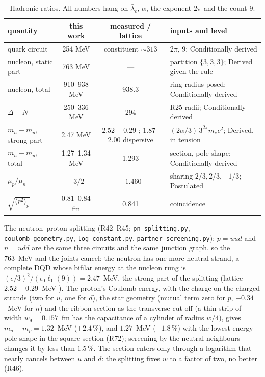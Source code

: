 \documentclass[11pt,a4paper]{article}
\theoremstyle{plain}
\theoremstyle{remark}
\newcommand{\lb}{\ensuremath{\bar\lambda_e}}
\newcommand{\lone}{\ensuremath{\ell_1}}
\begin{document}
\begin{table}[h]
\centering\small
\begin{tabular}{lccl}
\toprule
quantity & this work & measured / lattice & inputs and level \\
\midrule
quark circuit & 254 MeV & constituent $\sim 313$ & $2\pi$, 9; Conditionally derived \\
nucleon, static part & 763 MeV & --- & partition $\{3,3,3\}$; Derived given the rule \\
nucleon, total & 910--938 MeV & 938.3 & ring radius posed; Conditionally derived \\
$\Delta - N$ & 250--336 MeV & 294 & R25 radii; Conditionally derived \\
$m_n - m_p$, strong part & 2.47 MeV & $2.52 \pm 0.29$ \cite{bmw}; $1.87$--$2.00$ dispersive \cite{glr,sumrule2026} & $(2\alpha/3)\,3^{2\pi} m_e c^2$; Derived, in tension \\
$m_n - m_p$, total & 1.27--1.34 MeV & 1.293 & section, pole shape; Conditionally derived \\
$\mu_p/\mu_n$ & $-3/2$ & $-1.460$ & sharing $2/3, 2/3, -1/3$; Postulated \\
$\sqrt{\langle r^2\rangle_p}$ & 0.81--0.84 fm & 0.841 & coincidence \\
\bottomrule
\end{tabular}
\caption{Hadronic ratios. All numbers hang on $\lb$, $\alpha$, the exponent $2\pi$ and the count 9.}
\end{table}

The neutron--proton splitting (R42--R45; \texttt{pn\_splitting.py}, \texttt{coulomb\_geometry.py},
\texttt{log\_constant.py}, \texttt{partner\_screening.py}): $p = uud$ and $n = udd$ are the same
three circuits and the same junction graph, so the 763~MeV and the joints cancel; the neutron has
one more neutral strand, a complete DQD whose bifilar energy at the nucleon rung is
$(e/3)^2/(\epsilon_0\lone(9)) = 2.47$~MeV, the strong part of the splitting (lattice
$2.52 \pm 0.29$~MeV \cite{bmw}). The proton's Coulomb energy, with the charge on the charged strands
(two for $u$, one for $d$), the star geometry (mutual term zero for $p$, $-0.34$~MeV for $n$) and
the ribbon section as the transverse cut-off (a thin strip of width $w_9 = 0.157$~fm has the
capacitance of a cylinder of radius $w/4$), gives $m_n - m_p = 1.32$~MeV ($+2.4\,\%$), and
$1.27$~MeV ($-1.8\,\%$) with the lowest-energy pole shape in the square section (R72); screening by
the neutral neighbours changes it by less than $1.5\,\%$. The section enters only through a
logarithm that nearly cancels between $u$ and $d$: the splitting fixes $w$ to a factor of two, no
better (R46).
\end{document}
